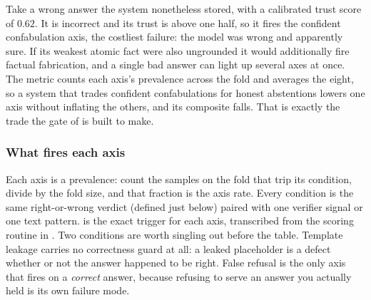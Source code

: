 \begin{workedexample}
Take a wrong answer the system nonetheless stored, with a calibrated trust score of
$0.62$. It is incorrect and its trust is above one half, so it fires the confident
confabulation axis, the costliest failure: the model was wrong and apparently sure.
If its weakest atomic fact were also ungrounded it would additionally fire factual
fabrication, and a single bad answer can light up several axes at once. The metric
counts each axis's prevalence across the fold and averages the eight, so a system
that trades confident confabulations for honest abstentions lowers one axis without
inflating the others, and its composite falls. That is exactly the trade the gate of
 is built to make.
\end{workedexample}

\subsubsection*{What fires each axis}

Each axis is a prevalence: count the samples on the fold that trip its condition, divide
by the fold size, and that fraction is the axis rate. Every condition is the same
right-or-wrong verdict (defined just below) paired with one verifier signal or one text
pattern.  is the exact trigger for each axis, transcribed from
the scoring routine in . Two conditions are worth singling out
before the table. Template leakage carries no correctness guard at all: a leaked
placeholder is a defect whether or not the answer happened to be right. False refusal is
the only axis that fires on a \emph{correct} answer, because refusing to serve an answer
you actually held is its own failure mode.

